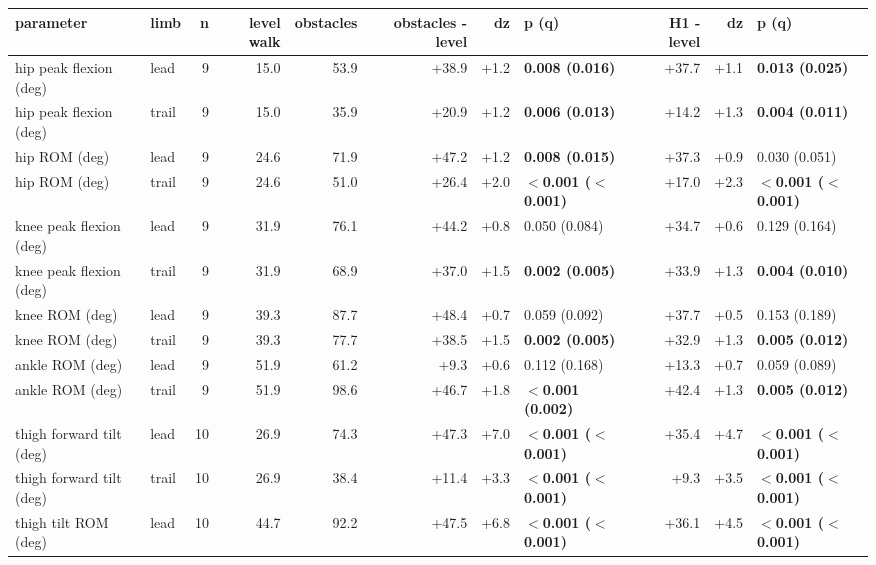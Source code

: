 \begin{adjustbox}{max width=\textwidth}
{\scriptsize
\begin{tabular}{llrrrrrlrrl}
\toprule
\textbf{parameter} & \textbf{limb} & \textbf{n} & \textbf{level walk} & \textbf{obstacles} & \textbf{obstacles - level} & \textbf{dz} & \textbf{p (q)} & \textbf{H1 - level} & \textbf{dz} & \textbf{p (q)} \\
\midrule
hip peak flexion (deg) & lead & 9 & 15.0 & 53.9 & +38.9 & +1.2 & \textbf{0.008 (0.016)} & +37.7 & +1.1 & \textbf{0.013 (0.025)} \\
hip peak flexion (deg) & trail & 9 & 15.0 & 35.9 & +20.9 & +1.2 & \textbf{0.006 (0.013)} & +14.2 & +1.3 & \textbf{0.004 (0.011)} \\
hip ROM (deg) & lead & 9 & 24.6 & 71.9 & +47.2 & +1.2 & \textbf{0.008 (0.015)} & +37.3 & +0.9 & 0.030 (0.051) \\
hip ROM (deg) & trail & 9 & 24.6 & 51.0 & +26.4 & +2.0 & \textbf{$<$0.001 ($<$0.001)} & +17.0 & +2.3 & \textbf{$<$0.001 ($<$0.001)} \\
knee peak flexion (deg) & lead & 9 & 31.9 & 76.1 & +44.2 & +0.8 & 0.050 (0.084) & +34.7 & +0.6 & 0.129 (0.164) \\
knee peak flexion (deg) & trail & 9 & 31.9 & 68.9 & +37.0 & +1.5 & \textbf{0.002 (0.005)} & +33.9 & +1.3 & \textbf{0.004 (0.010)} \\
knee ROM (deg) & lead & 9 & 39.3 & 87.7 & +48.4 & +0.7 & 0.059 (0.092) & +37.7 & +0.5 & 0.153 (0.189) \\
knee ROM (deg) & trail & 9 & 39.3 & 77.7 & +38.5 & +1.5 & \textbf{0.002 (0.005)} & +32.9 & +1.3 & \textbf{0.005 (0.012)} \\
ankle ROM (deg) & lead & 9 & 51.9 & 61.2 & +9.3 & +0.6 & 0.112 (0.168) & +13.3 & +0.7 & 0.059 (0.089) \\
ankle ROM (deg) & trail & 9 & 51.9 & 98.6 & +46.7 & +1.8 & \textbf{$<$0.001 (0.002)} & +42.4 & +1.3 & \textbf{0.005 (0.012)} \\
thigh forward tilt (deg) & lead & 10 & 26.9 & 74.3 & +47.3 & +7.0 & \textbf{$<$0.001 ($<$0.001)} & +35.4 & +4.7 & \textbf{$<$0.001 ($<$0.001)} \\
thigh forward tilt (deg) & trail & 10 & 26.9 & 38.4 & +11.4 & +3.3 & \textbf{$<$0.001 ($<$0.001)} & +9.3 & +3.5 & \textbf{$<$0.001 ($<$0.001)} \\
thigh tilt ROM (deg) & lead & 10 & 44.7 & 92.2 & +47.5 & +6.8 & \textbf{$<$0.001 ($<$0.001)} & +36.1 & +4.5 & \textbf{$<$0.001 ($<$0.001)} \\

\end{tabular}}
\end{adjustbox}
